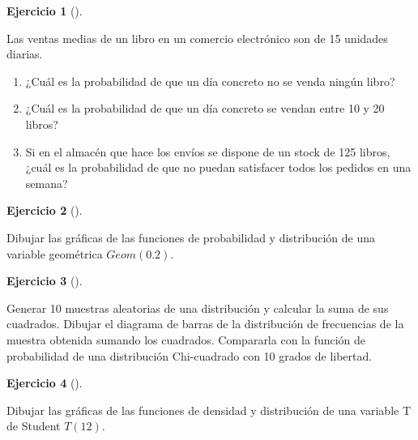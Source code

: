 \documentclass[
  a4paper,
]{scrreport}
\theoremstyle{definition}
\newtheorem{exercise}{Ejercicio}[chapter]
\theoremstyle{remark}
\begin{document}
\begin{exercise}[]\protect\hypertarget{exr-distribuciones-probabilidad-8}{}\label{exr-distribuciones-probabilidad-8}

Las ventas medias de un libro en un comercio electrónico son de 15
unidades diarias.

\begin{enumerate}
\def\labelenumi{\alph{enumi}.}
\item
  ¿Cuál es la probabilidad de que un día concreto no se venda ningún
  libro?
\item
  ¿Cuál es la probabilidad de que un día concreto se vendan entre 10 y
  20 libros?
\item
  Si en el almacén que hace los envíos se dispone de un stock de 125
  libros, ¿cuál es la probabilidad de que no puedan satisfacer todos los
  pedidos en una semana?
\end{enumerate}

\end{exercise}

\begin{exercise}[]\protect\hypertarget{exr-distribuciones-probabilidad-9}{}\label{exr-distribuciones-probabilidad-9}

Dibujar las gráficas de las funciones de probabilidad y distribución de
una variable geométrica \(Geom(0.2)\).

\end{exercise}

\begin{exercise}[]\protect\hypertarget{exr-distribuciones-probabilidad-10}{}\label{exr-distribuciones-probabilidad-10}

Generar 10 muestras aleatorias de una distribución y calcular la suma de
sus cuadrados. Dibujar el diagrama de barras de la distribución de
frecuencias de la muestra obtenida sumando los cuadrados. Compararla con
la función de probabilidad de una distribución Chi-cuadrado con 10
grados de libertad.

\end{exercise}

\begin{exercise}[]\protect\hypertarget{exr-distribuciones-probabilidad-11}{}\label{exr-distribuciones-probabilidad-11}

Dibujar las gráficas de las funciones de densidad y distribución de una
variable T de Student \(T(12)\).

\end{exercise}

\end{document}
